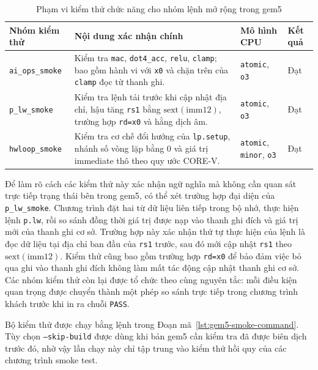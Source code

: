 \documentclass[../DoAn.tex]{subfiles}
\begin{document}
\begin{table}[H]
    \centering
    \small
    \setlength{\tabcolsep}{3pt}
    \renewcommand{\arraystretch}{1.18}
    \begin{tabular}{|>{\raggedright\arraybackslash}p{3.30cm}|>{\raggedright\arraybackslash}p{4.95cm}|>{\raggedright\arraybackslash}p{2.20cm}|>{\raggedright\arraybackslash}p{1.55cm}|}
        \hline
        \textbf{Nhóm kiểm thử} & \textbf{Nội dung xác nhận chính} & \textbf{Mô hình CPU} & \textbf{Kết quả} \\
        \hline
        \texttt{ai\_ops\_smoke} & Kiểm tra \texttt{mac}, \texttt{dot4\_acc}, \texttt{relu}, \texttt{clamp}; bao gồm hành vi với \texttt{x0} và chặn trên của \texttt{clamp} đọc từ thanh ghi. & \texttt{atomic}, \texttt{o3} & Đạt \\
        \hline
        \texttt{p\_lw\_smoke} & Kiểm tra lệnh tải trước khi cập nhật địa chỉ, hậu tăng \texttt{rs1} bằng \(\mathrm{sext}(\mathrm{imm12})\), trường hợp \texttt{rd=x0} và hằng dịch âm. & \texttt{atomic}, \texttt{o3} & Đạt \\
        \hline
        \texttt{hwloop\_smoke} & Kiểm tra cơ chế đổi hướng của \texttt{lp.setup}, nhánh số vòng lặp bằng 0 và giá trị immediate thô theo quy ước CORE-V. & \texttt{atomic}, \texttt{minor}, \texttt{o3} & Đạt \\
        \hline
    \end{tabular}
    \caption{Phạm vi kiểm thử chức năng cho nhóm lệnh mở rộng trong gem5}
    \label{tab:gem5-smoke-tests}
\end{table}

Để làm rõ cách các kiểm thử này xác nhận ngữ nghĩa mà không cần quan sát trực tiếp trạng thái bên trong gem5, có thể xét trường hợp đại diện của \texttt{p\_lw\_smoke}. Chương trình đặt hai từ dữ liệu liên tiếp trong bộ nhớ, thực hiện lệnh \texttt{p.lw}, rồi so sánh đồng thời giá trị được nạp vào thanh ghi đích và giá trị mới của thanh ghi cơ sở. Trường hợp này xác nhận thứ tự thực hiện của lệnh là đọc dữ liệu tại địa chỉ ban đầu của \texttt{rs1} trước, sau đó mới cập nhật \texttt{rs1} theo \(\mathrm{sext}(\mathrm{imm12})\). Kiểm thử cũng bao gồm trường hợp \texttt{rd=x0} để bảo đảm việc bỏ qua ghi vào thanh ghi đích không làm mất tác động cập nhật thanh ghi cơ sở. Các nhóm kiểm thử còn lại được tổ chức theo cùng nguyên tắc: mỗi điều kiện quan trọng được chuyển thành một phép so sánh trực tiếp trong chương trình khách trước khi in ra chuỗi \texttt{PASS}.

Bộ kiểm thử được chạy bằng lệnh trong Đoạn mã~\ref{lst:gem5-smoke-command}. Tùy chọn \texttt{--skip-build} được dùng khi bản gem5 cần kiểm tra đã được biên dịch trước đó, nhờ vậy lần chạy này chỉ tập trung vào kiểm thử hồi quy của các chương trình smoke test.
\end{document}
